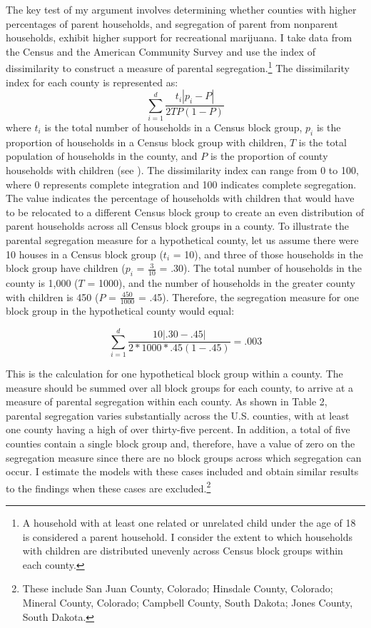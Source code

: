 The key test of my argument involves determining whether counties with higher percentages of parent households, and segregation of parent from nonparent households, exhibit higher support for recreational marijuana. I take data from the Census and the American Community Survey and use the index of dissimilarity to construct a measure of parental segregation.\footnote{A household with at least one related or unrelated child under the age of 18 is considered a parent household. I consider the extent to which households with children are distributed unevenly across Census block groups within each county.} The dissimilarity index for each county is represented as:
\begin{equation}
\sum_{i = 1}^{d} \frac{t_{i} \left| p_{i}-P \right|}{2TP (1-P)}
\end{equation}
where $t_{i}$ is the total number of households in a Census block group, $p_{i}$ is the proportion of households in a Census block group with children, $T$ is the total population of households in the county, and $P$ is the proportion of county households with children (see \citealt{massey_and_denton_1988}). The dissimilarity index can range from 0 to 100, where 0 represents complete integration and 100 indicates complete segregation. The value indicates the percentage of households with children that would have to be relocated to a different Census block group to create an even distribution of parent households across all Census block groups in a county. To illustrate the parental segregation measure for a hypothetical county, let us assume there were 10 houses in a Census block group ($t_{i}$ = 10), and three of those households in the block group have children ($p_{i}$  = $\frac{3}{10}$ = .30). The total number of households in the county is 1,000 ($T$ = 1000), and the number of households in the greater county with children is 450 ($P$ = $\frac{450}{1000}$ = .45). Therefore, the segregation measure for one block group in the hypothetical county would equal: 

\begin{equation}
\sum_{i = 1}^{d} \frac{10 \left| .30-.45 \right|}{2*1000*.45(1-.45)} = .003
\end{equation}

This is the calculation for one hypothetical block group within a county. The measure should be summed over all block groups for each county, to arrive at a measure of parental segregation within each county. 
As shown in Table 2, parental segregation varies substantially across the U.S. counties, with at least one county having a high of over thirty-five percent. In addition, a total of five counties contain a single block group and, therefore, have a value of zero on the segregation measure since there are no block groups across which segregation can occur. I estimate the models with these cases included and obtain similar results to the findings when these cases are excluded.\footnote{These include San Juan County, Colorado; Hinsdale County, Colorado; Mineral County, Colorado; Campbell County, South Dakota; Jones County, South Dakota.}

